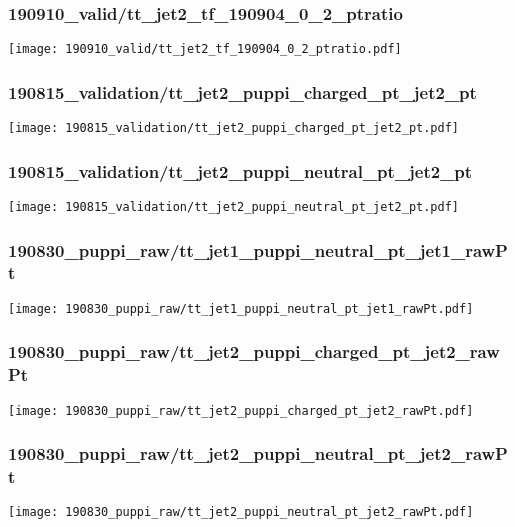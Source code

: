 \begin{frame}
   \frametitle{\small 190910\_valid/tt\_jet2\_tf\_190904\_0\_2\_ptratio}
   \centering
   \texttt{[image: 190910\_valid/tt\_jet2\_tf\_190904\_0\_2\_ptratio.pdf]}
\end{frame}

\begin{frame}
   \frametitle{\small 190815\_validation/tt\_jet2\_puppi\_charged\_pt\_jet2\_pt}
   \centering
   \texttt{[image: 190815\_validation/tt\_jet2\_puppi\_charged\_pt\_jet2\_pt.pdf]}
\end{frame}

\begin{frame}
   \frametitle{\small 190815\_validation/tt\_jet2\_puppi\_neutral\_pt\_jet2\_pt}
   \centering
   \texttt{[image: 190815\_validation/tt\_jet2\_puppi\_neutral\_pt\_jet2\_pt.pdf]}
\end{frame}

\begin{frame}
   \frametitle{\small 190830\_puppi\_raw/tt\_jet1\_puppi\_neutral\_pt\_jet1\_rawPt}
   \centering
   \texttt{[image: 190830\_puppi\_raw/tt\_jet1\_puppi\_neutral\_pt\_jet1\_rawPt.pdf]}
\end{frame}

\begin{frame}
   \frametitle{\small 190830\_puppi\_raw/tt\_jet2\_puppi\_charged\_pt\_jet2\_rawPt}
   \centering
   \texttt{[image: 190830\_puppi\_raw/tt\_jet2\_puppi\_charged\_pt\_jet2\_rawPt.pdf]}
\end{frame}

\begin{frame}
   \frametitle{\small 190830\_puppi\_raw/tt\_jet2\_puppi\_neutral\_pt\_jet2\_rawPt}
   \centering
   \texttt{[image: 190830\_puppi\_raw/tt\_jet2\_puppi\_neutral\_pt\_jet2\_rawPt.pdf]}
\end{frame}

